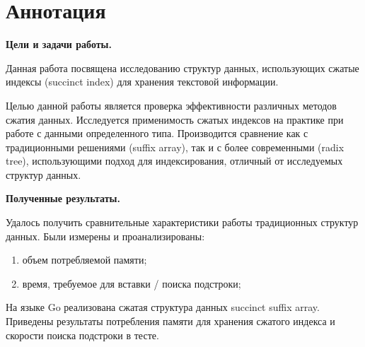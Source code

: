 \newpage
\section*{Аннотация}

\textbf{Цели и задачи работы.}

Данная работа посвящена исследованию структур данных,
использующих сжатые индексы (succinct index) для хранения текстовой информации.

Целью данной работы является проверка эффективности различных методов сжатия данных.
Исследуется применимость сжатых индексов на практике при работе с данными определенного типа.
Производится сравнение как с традиционными решениями (suffix array), так и с более современными (radix tree),
использующими подход для индексирования, отличный от исследуемых структур данных.


\textbf{Полученные результаты.}


Удалось получить сравнительные характеристики работы традиционных структур данных.
Были измерены и проанализированы:
\begin{enumerate}
    \item объем потребляемой памяти;
    \item время, требуемое для вставки / поиска подстроки;
\end{enumerate}

На языке Go реализована сжатая структура данных succinct suffix array. Приведены результаты потребления памяти
для хранения сжатого индекса и скорости поиска подстроки в тесте.


